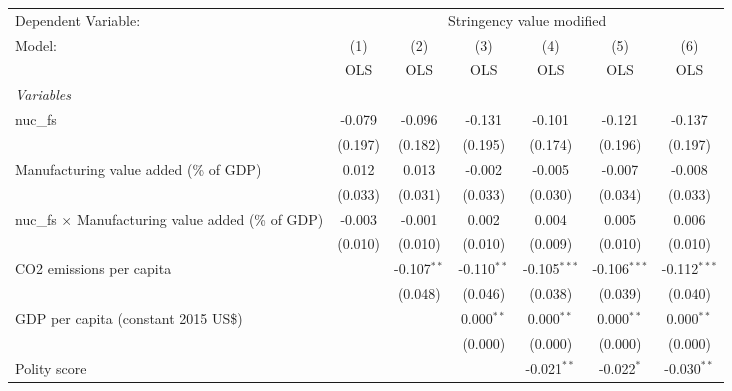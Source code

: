 
\begingroup
\centering
\begin{tabular}{lcccccc}
   \toprule
   Dependent Variable: & \multicolumn{6}{c}{Stringency value modified}\\
   Model:                                                    & (1)     & (2)           & (3)           & (4)            & (5)            & (6)\\  
                                                             &  OLS    & OLS           & OLS           & OLS            & OLS            & OLS\\  
   \midrule
   \emph{Variables}\\
   nuc\_fs                                                   & -0.079  & -0.096        & -0.131        & -0.101         & -0.121         & -0.137\\   
                                                             & (0.197) & (0.182)       & (0.195)       & (0.174)        & (0.196)        & (0.197)\\   
   Manufacturing value added (\% of GDP)                     & 0.012   & 0.013         & -0.002        & -0.005         & -0.007         & -0.008\\   
                                                             & (0.033) & (0.031)       & (0.033)       & (0.030)        & (0.034)        & (0.033)\\   
   nuc\_fs $\times$ Manufacturing value added (\% of GDP)    & -0.003  & -0.001        & 0.002         & 0.004          & 0.005          & 0.006\\   
                                                             & (0.010) & (0.010)       & (0.010)       & (0.009)        & (0.010)        & (0.010)\\   
   CO2 emissions per capita                                  &         & -0.107$^{**}$ & -0.110$^{**}$ & -0.105$^{***}$ & -0.106$^{***}$ & -0.112$^{***}$\\   
                                                             &         & (0.048)       & (0.046)       & (0.038)        & (0.039)        & (0.040)\\   
   GDP per capita (constant 2015 US\$)                       &         &               & 0.000$^{**}$  & 0.000$^{**}$   & 0.000$^{**}$   & 0.000$^{**}$\\   
                                                             &         &               & (0.000)       & (0.000)        & (0.000)        & (0.000)\\   
   Polity score                                              &         &               &               & -0.021$^{**}$  & -0.022$^{*}$   & -0.030$^{**}$\\   

\end{tabular}
